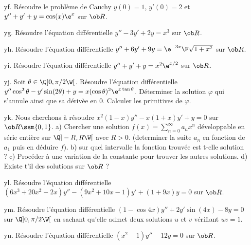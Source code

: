 \exo [Level=2,Fight=0,Learn=0,Field=\EquationsDifférentiellesLinéairesDuSecondOrdre,Type=\Exercices,Origin=] yf. 
Résoudre le problème de Cauchy $y(0)=1$, $y'(0)=2$ et $y''+y'+y=\cos(x)\e^x$ sur $\ob R$.

\exo [Level=2,Fight=0,Learn=0,Field=\EquationsDifférentiellesLinéairesDuSecondOrdre,Type=\Exercices,Origin=] yg. 
Résoudre l'équation différentielle $y''-3y'+2y=x^3$ sur $\ob R$.

\exo [Level=2,Fight=1,Learn=0,Field=\EquationsDifférentiellesLinéairesDuSecondOrdre,Type=\Exercices,Origin=] yh. 
Résoudre l'équation différentielle $y''+6y'+9y={\e^{-3x}\F\sqrt{1+x^2}}$ sur $\ob R$.

\exo [Level=2,Fight=0,Learn=0,Field=\EquationsDifférentiellesLinéairesDuSecondOrdre,Type=\Exercices,Origin=] yi. 
Résoudre l'équation différentielle $y''+y'+y=x^2\e^{x/2}$ sur $\ob R$.

\exo [Level=2,Fight=1,Learn=0,Field=\EquationsDifférentiellesLinéairesDuSecondOrdre,Type=\Exercices,Origin=] yj. 
Soit $\theta\in\Q]0,\pi/2\W[$. 
Résoudre l'équation différentielle 
$y''\cos^2\theta-y'\sin(2\theta)+y=x(\cos\theta)^2\e^{x\tan\theta}$. 
Déterminer la solution $\varphi$ qui s'annule ainsi 
que sa dérivèe en $0$. Calculer les primitives de $\varphi$. 

\exo [Level=2,Fight=0,Learn=0,Field=\SériesEntières,Type=\Exercices,Origin=,Indication={$f(t)={x\F1-x}$}] yk. 
Nous cherchons à résoudre $x^2(1-x)y''-x(1+x)y'+y=0$ sur $\ob R\ssm\{0,1\}$. \pn
a) Chercher une solution $f(x)=\sum_{n=0}^\infty a_nx^n$ développable en série entière sur $\Q]-R,R\W[$ avec $R>0$. 
(determiner la suite $a_n$ en fonction de $a_1$ puis en déduire $f$). \pn
b) sur quel intervalle la fonction trouvée est t-elle solution ? \pn
c) Procéder à une variation de la constante pour trouver les autres solutions. \pn
d) Existe t'il des solutions sur $\ob R$ ?

\exo [Level=2,Fight=0,Learn=0,Field=\EquationsDifférentiellesLinéairesDuSecondOrdre,Type=\Others,Origin=] yl. 
Résoudre l'équation différentielle $(6x^3+20x^2-2x)y''-(9x^2+10x-1)y'+(1+9x)y=0$ sur $\ob R$.

\exo [Level=2,Fight=0,Learn=0,Field=\EquationsDifférentiellesLinéairesDuSecondOrdre,Type=\Colles,Origin=] ym. 
Résoudre l'équation différentielle $(1-\cos 4x)y''+2y'\sin(4x)-8y=0$ sur 
$\Q]0,\pi/2\W[$ en sachant qu'elle admet deux solutions $u$ et $v$ vérifiant $uv=1$.

\exo [Level=2,Fight=0,Learn=0,Field=\SériesEntières,Type=\Exercices,Origin=] yn. 
Résoudre l'équation différentielle $(x^2-1)y''-12y=0$ sur $\ob R$.

